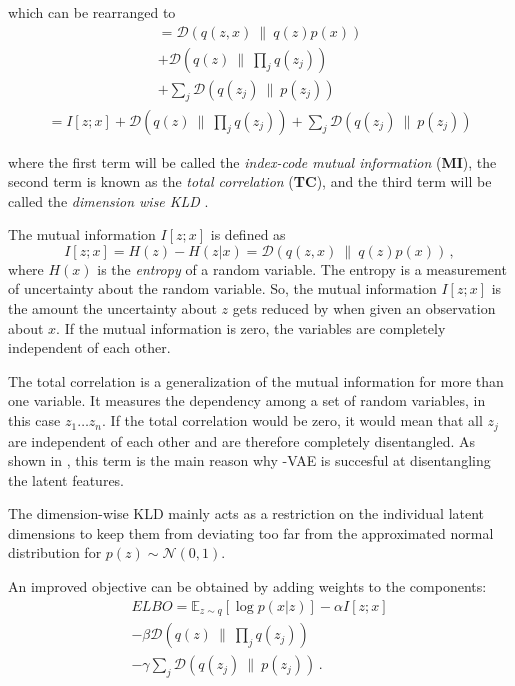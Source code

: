 \documentclass[a4paper]{IEEEtran}
\begin{document}
{which can be rearranged to 
\begin{align*}
	= \mathcal{D}(q(z, x) \ \| \ q(z)p(x)) \\ + \mathcal{D}(q(z) \ \| \  \prod_{j} q(z_j)) \\ + \sum_j \mathcal{D}(q(z_j) \ \| \ p(z_j))
\end{align*}
\begin{align*}
	= I[z;x] + \mathcal{D}(q(z) \ \| \  \prod_{j} q(z_j)) + \sum_j \mathcal{D}(q(z_j) \ \| \ p(z_j))
\end{align*}

where the first term will be called the \textit{index-code mutual information} (\textbf{MI}), the second term is known as the \textit{total correlation} (\textbf{TC}), and the third term will be called the \textit{dimension wise KLD} \cite{chen2019isolating}.

The mutual information $I\left[ z; x \right]$ is defined as
\begin{equation}
	I[z;x] = H(z) - H(z|x) = \mathcal{D}(q(z, x) \ \| \ q(z)p(x))\,,
\end{equation}
where $H(x)$ is the \textit{entropy} of a random variable. The entropy is a measurement of uncertainty about the random variable. So, the mutual information $I[z;x]$ is the amount the uncertainty about $z$ gets reduced by when given an observation about $x$. If the mutual information is zero, the variables are completely independent of each other.

The total correlation is a generalization of the mutual information for more than one variable. It measures the dependency among a set of random variables, in this case $z_1 \ldots z_n$. If the total correlation would be zero, it would mean that all $z_j$ are independent of each other and are therefore completely disentangled. As shown in \cite{chen2019isolating}, this term is the main reason why \textbeta -VAE is succesful at disentangling the latent features.

The dimension-wise KLD mainly acts as a restriction on the individual latent dimensions to keep them from deviating too far from the approximated normal distribution for $p(z) \sim \mathcal{N}(0,1)$.

An improved objective can be obtained by adding weights to the components:
\begin{align*}
	ELBO = \mathbb{E}_{z \sim q}\left[ \log p(x|z) \right] - \alpha I[z;x] \\ - \beta \mathcal{D}(q(z) \ \| \  \prod_{j} q(z_j)) \\ - \gamma \sum_j \mathcal{D}(q(z_j) \ \| \ p(z_j))\,.
\end{align*}

}
\end{document}
